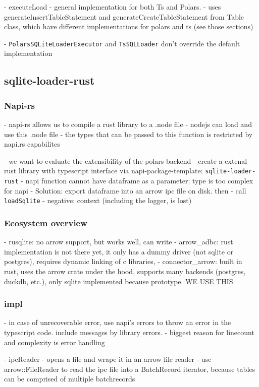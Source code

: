 - executeLoad
- general implementation for both Ts and Polars.
- uses generateInsertTableStatement and generateCreateTableStatement from Table class, which have different implementations for polars and ts (see those sections)

- \Verb|PolarsSQLiteLoaderExecutor| and \Verb|TsSQLLoader| don't override the default implementation

\subsection{sqlite-loader-rust}
\label{subsection:sqlite-loader-rust}

\subsubsection{Napi-rs}
- napi-rs allows us to compile a rust library to a .node file
- nodejs can load and use this .node file
- the types that can be passed to this function is restricted by napi.rs capabilites

- we want to evaluate the extensibility of the polars backend
- create a extenal rust library with typescript interface via napi-package-template: \Verb|sqlite-loader-rust|
- napi function cannot have dataframe as a parameter: type is too complex for napi
- Solution: export dataframe into an arrow ipc file on disk. then
- call \Verb|loadSqlite|
- negative: context (including the logger, is lost)

\subsubsection{Ecosystem overview}
- rusqlite: no arrow support, but works well, can write
- arrow\_adbc: rust implementation is not there yet, it only has a dummy driver (not sqlite or postgres), requires dynamic linking of c libraries,
- connector\_arrow: built in rust, uses the arrow crate under the hood, supports many backends (postgres, duckdb, etc.), only sqlite implemented because prototype. WE USE THIS

\subsubsection{impl}
- in case of unrecoverable error, use napi's errors to throw an error in the typescript code. include messages by library errors.
- biggest reason for linecount and complexity is error handling

- ipcReader
- opens a file and wrape it in an arrow file reader
- use arrow::FileReader to read the ipc file into a BatchRecord iterator, because tables can be comprised of multiple batchrecords

